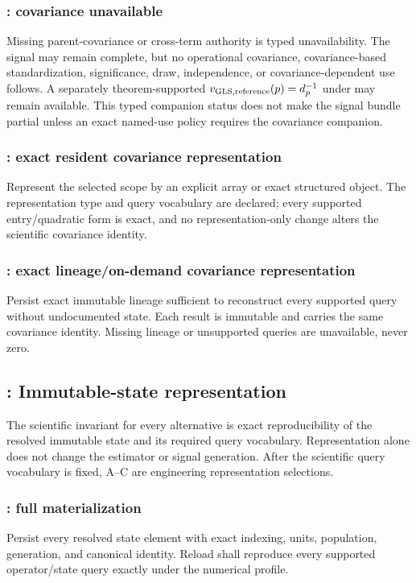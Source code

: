 \subsubsection{: covariance unavailable}
Missing parent-covariance or cross-term authority is typed unavailability. The
signal may remain complete, but no operational covariance, covariance-based
standardization, significance, draw, independence, or covariance-dependent use
follows. A separately theorem-supported
$v_{{\rm GLS,reference}}(p)=d_p^{-1}$ under  may remain available.
This typed companion
status does not make the signal bundle partial unless an exact named-use policy
requires the covariance companion.

\subsubsection{: exact resident covariance representation}
Represent the selected scope by an explicit array or exact structured object.
The representation type and query vocabulary are declared; every supported
entry/quadratic form is exact, and no representation-only change alters the
scientific covariance identity.

\subsubsection{: exact lineage/on-demand covariance representation}
Persist exact immutable lineage sufficient to reconstruct every supported
query without undocumented state. Each result is immutable and carries the
same covariance identity. Missing lineage or unsupported queries are
unavailable, never zero.

\subsection{: Immutable-state representation}

The scientific invariant for every alternative is exact reproducibility of the
resolved immutable state and its required query vocabulary. Representation
alone does not change the estimator or signal generation. After the scientific
query vocabulary is fixed, A--C are engineering representation selections.

\subsubsection{: full materialization}
Persist every resolved state element with exact indexing, units, population,
generation, and canonical identity. Reload shall reproduce every supported
operator/state query exactly under the numerical profile.


